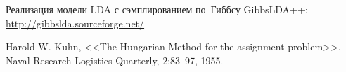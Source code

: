 \documentclass[12pt]{article}
\begin{document}

% 

\begin{thebibliography}{0}
  Реализация модели LDA с сэмплированием по~Гиббсу GibbsLDA++: \url{http://gibbslda.sourceforge.net/}

  Harold W. Kuhn, <<The Hungarian Method for the assignment problem>>, Naval Research Logistics Quarterly, 2:83–97, 1955.
\end{thebibliography}
\end{document}
